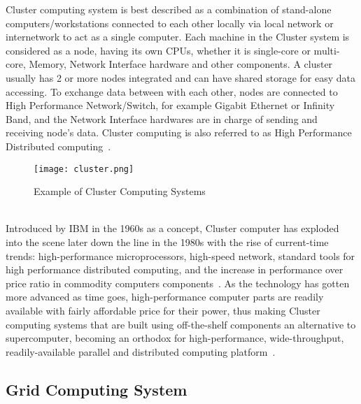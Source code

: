 Cluster computing system is best described as a combination of stand-alone computers/workstations connected to each other locally via local network or internetwork to act as a single computer. Each machine in the Cluster system is considered as a node, having its own CPUs, whether it is single-core or multi-core, Memory, Network Interface hardware and other components. A cluster usually has 2 or more nodes integrated and can have shared storage for easy data accessing. To exchange data between with each other, nodes are connected to High Performance Network/Switch, for example Gigabit Ethernet or Infinity Band, and the Network Interface hardwares are in charge of sending and receiving node's data. Cluster computing is also referred to as High Performance Distributed computing~\cite{intro_cluster}. \\
\begin{figure}[H]
\texttt{[image: cluster.png]}
\centering
\caption{Example of Cluster Computing Systems}
\end{figure}
~\\
Introduced by IBM in the 1960s as a concept, Cluster computer has exploded into the scene later down the line in the 1980s with the rise of current-time trends: high-performance microprocessors, high-speed network, standard tools for high performance distributed computing, and the increase in performance over price ratio in commodity computers components~\cite{ic_cluster}. As the technology has gotten more advanced as time goes, high-performance computer parts are readily available with fairly affordable price for their power, thus making Cluster computing systems that are built using off-the-shelf components an alternative to supercomputer, becoming an orthodox for high-performance, wide-throughput, readily-available parallel and distributed computing platform~\cite{intro_cluster}. \\

\subsection{Grid Computing System}

